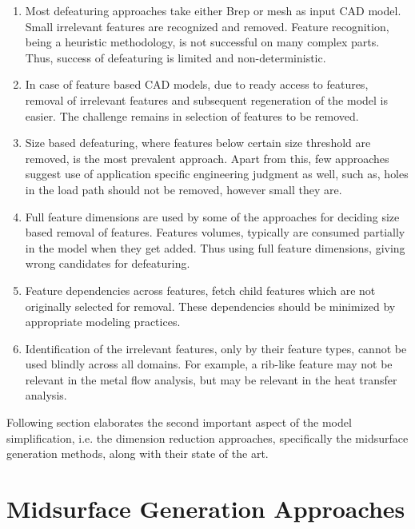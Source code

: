 \begin{enumerate}[noitemsep,topsep=2pt,parsep=2pt,partopsep=2pt]
	\item Most defeaturing approaches take either Brep or mesh as input CAD model. Small irrelevant features are recognized and removed. Feature recognition, being a heuristic methodology, is not successful on many complex parts. Thus, success of defeaturing is limited and non-deterministic.
	\item In case of feature based CAD models, due to ready access to features, removal of irrelevant features and subsequent regeneration of the model is easier. The challenge remains in selection of features to be removed.
	\item Size based defeaturing, where features below certain size threshold are removed, is the most prevalent approach. Apart from this, few approaches suggest use of application specific engineering judgment as well, such as, holes in the load path should not be removed, however small they are.
	\item Full feature dimensions are used by some of the approaches for deciding size based removal of features. Features volumes, typically are consumed partially in the model when they get added. Thus using full feature dimensions, giving wrong candidates for defeaturing.
	\item Feature dependencies across features, fetch child features which are not originally selected for removal. These dependencies should be minimized by appropriate modeling practices.
\item Identification of the irrelevant features, only by their feature types, cannot be used blindly across all domains. For example, a rib-like feature may not be relevant in the metal flow analysis, but may be relevant in the heat transfer analysis. 
\end{enumerate}


Following section elaborates the second important aspect of the model simplification, i.e. the dimension reduction approaches, specifically the midsurface generation methods, along with their state of the art.

\section{Midsurface Generation Approaches}

